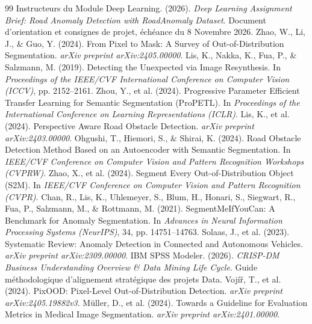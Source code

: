\documentclass[11pt,a4paper]{article} \usepackage[utf8]{inputenc} \usepackage[T1]{fontenc}
\begin{document}
\begin{thebibliography}{99}
 Instructeurs du Module Deep Learning. (2026). \newblock \emph{Deep Learning
Assignment Brief: Road Anomaly Detection with RoadAnomaly Dataset}. \newblock Document d'orientation et
consignes de projet, échéance du 8 Novembre 2026.
 Zhao, W., Li, J., \& Guo, Y. (2024). \newblock From Pixel to Mask: A Survey of
Out-of-Distribution Segmentation. \newblock \emph{arXiv preprint arXiv:2405.00000}.
 Lis, K., Nakka, K., Fua, P., \& Salzmann, M. (2019). \newblock Detecting the
Unexpected via Image Resynthesis. \newblock In \emph{Proceedings of the IEEE/CVF International Conference
on Computer Vision (ICCV)}, pp. 2152--2161.
 Zhou, Y., et al. (2024). \newblock Progressive Parameter Efficient Transfer
Learning for Semantic Segmentation (ProPETL). \newblock In \emph{Proceedings of the International
Conference on Learning Representations (ICLR)}.
 Lis, K., et al. (2024). \newblock Perspective Aware Road Obstacle Detection.
\newblock \emph{arXiv preprint arXiv:2403.00000}.
 Ohgushi, T., Hiemori, S., \& Shirai, K. (2024). \newblock Road Obstacle Detection
Method Based on an Autoencoder with Semantic Segmentation. \newblock In \emph{IEEE/CVF Conference on
Computer Vision and Pattern Recognition Workshops (CVPRW)}.
 Zhao, X., et al. (2024). \newblock Segment Every Out-of-Distribution Object (S2M).
\newblock In \emph{IEEE/CVF Conference on Computer Vision and Pattern Recognition (CVPR)}.
 Chan, R., Lis, K., Uhlemeyer, S., Blum, H., Honari, S., Siegwart, R.,
Fua, P., Salzmann, M., \& Rottmann, M. (2021). \newblock SegmentMeIfYouCan: A Benchmark for Anomaly
Segmentation. \newblock In \emph{Advances in Neural Information Processing Systems (NeurIPS)}, 34, pp.
14751--14763.
 Solaas, J., et al. (2023). \newblock Systematic Review: Anomaly Detection in Connected
and Autonomous Vehicles. \newblock \emph{arXiv preprint arXiv:2309.00000}.
 IBM SPSS Modeler. (2026). \newblock \emph{CRISP-DM Business Understanding Overview
\& Data Mining Life Cycle}. \newblock Guide méthodologique d'alignement stratégique des projets Data.
 Vojíř, T., et al. (2024). \newblock PixOOD: Pixel-Level Out-of-Distribution
Detection. \newblock \emph{arXiv preprint arXiv:2405.19882v3}.
 Müller, D., et al. (2024). \newblock Towards a Guideline for Evaluation Metrics in
Medical Image Segmentation. \newblock \emph{arXiv preprint arXiv:2401.00000}.
\end{thebibliography}
\end{document}
